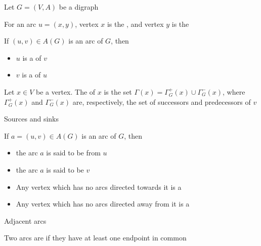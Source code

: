 \documentclass[aspectratio=43]{beamer}
\begin{document}
\begin{frame}
	Let $G=(V,A)$ be a digraph
	\begin{definition}
	For an arc $u=(x,y)$, vertex $x$ is the , and vertex $y$ is the 
	\end{definition}
	\begin{definition}
		If $(u,v)\in A(G)$ is an arc of $G$, then
		\begin{itemize}
			\item  $u$ is a  of $v$
			\item  $v$ is a  of $u$
		\end{itemize}
	\end{definition}
	\begin{definition}
	Let $x\in V$ be a vertex. The  of $x$ is the set $\Gamma(x) = \Gamma^+_G(x)\cup\Gamma^-_G(x)$, where $\Gamma^+_G(x)$ and $\Gamma^-_G(x)$ are, respectively, the set of successors and predecessors of $v$
	\end{definition}
\end{frame}
	
	
\begin{frame}{Sources and sinks}
	\begin{definition}
		If $a=(u,v)\in A(G)$ is an arc of $G$, then
		\begin{itemize}
			\item the arc $a$ is said to be  from $u$
			\item the arc $a$ is said to be  $v$
		\end{itemize}
	\end{definition}
	\vfill
	\begin{definition}
		\begin{itemize}
			\item Any vertex which has no arcs directed towards it is a 
			\item Any vertex which has no arcs directed away from it is a 
		\end{itemize}
	\end{definition}
\end{frame}

\begin{frame}{Adjacent arcs}
	\begin{definition}
		Two arcs are  if they have at least one endpoint in common
	\end{definition}
\end{frame}
\end{document}
